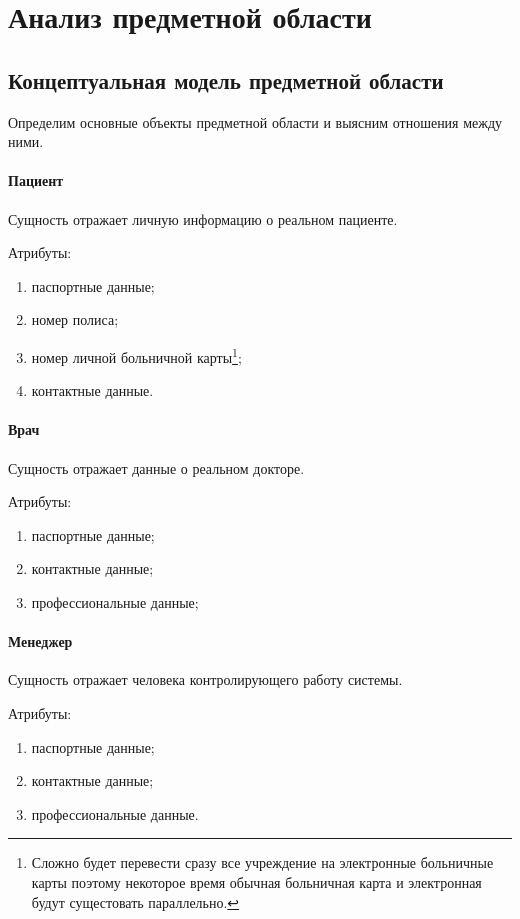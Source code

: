 \newpage
\chapter{Анализ предметной области}
\section{Концептуальная модель предметной области}

Определим основные объекты предметной области и выясним отношения между ними.

\subsubsection{Пациент}
Сущность отражает личную информацию о реальном пациенте.

Атрибуты:
\begin{enumerate}
  \item паспортные данные;
  \item номер полиса;
  \item номер личной больничной карты\footnote{
  	Сложно будет перевести сразу все учреждение на электронные больничные карты
  	поэтому некоторое время обычная больничная карта и электронная будут
  	сущестовать параллельно.
  };
  \item контактные данные.
\end{enumerate}

\subsubsection{Врач}
Сущность отражает данные о реальном докторе.

Атрибуты:
\begin{enumerate}
  \item паспортные данные;
  \item контактные данные;
  \item профессиональные данные; 
\end{enumerate}

\subsubsection{Менеджер}
Сущность отражает человека контролирующего работу системы.

Атрибуты:
\begin{enumerate}
  \item паспортные данные;
  \item контактные данные;
  \item профессиональные данные.   
\end{enumerate}


